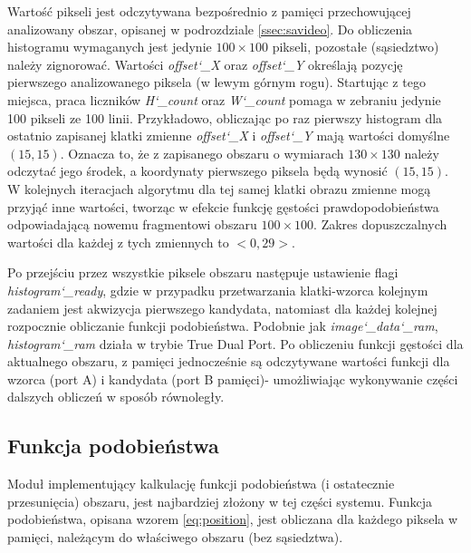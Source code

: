Wartość pikseli jest odczytywana bezpośrednio z pamięci przechowującej analizowany obszar, opisanej w podrozdziale \ref{ssec:savideo}. 
Do obliczenia histogramu wymaganych jest jedynie $100\times 100$ pikseli, pozostałe (sąsiedztwo) należy zignorować. %
Wartości \textit{offset\char`_X} oraz \textit{offset\char`_Y} określają pozycję pierwszego analizowanego piksela (w lewym górnym rogu). Startując z tego miejsca, praca liczników \textit{H\char`_count} oraz \textit{W\char`_count} pomaga w zebraniu jedynie 100 pikseli ze 100 linii. %
Przykładowo, obliczając po raz pierwszy histogram dla ostatnio zapisanej klatki zmienne \textit{offset\char`_X} i \textit{offset\char`_Y} mają wartości domyślne $(15,15)$. 
Oznacza to, że z zapisanego obszaru o wymiarach $130\times 130$ należy odczytać jego środek, a koordynaty pierwszego piksela będą wynosić $(15,15)$. W kolejnych iteracjach algorytmu dla tej samej klatki obrazu zmienne mogą przyjąć inne wartości, tworząc w efekcie funkcję gęstości prawdopodobieństwa odpowiadającą nowemu fragmentowi obszaru $100\times 100$. %
Zakres dopuszczalnych wartości dla każdej z tych zmiennych to $<0,29>$. 

Po przejściu przez wszystkie piksele obszaru następuje ustawienie flagi \textit{histogram\char`_ready}, gdzie w przypadku przetwarzania klatki-wzorca kolejnym zadaniem jest akwizycja pierwszego kandydata, natomiast dla każdej kolejnej rozpocznie obliczanie funkcji podobieństwa.
Podobnie jak \textit{image\char`_data\char`_ram}, \textit{histogram\char`_ram} działa w trybie True Dual Port. %
Po obliczeniu funkcji gęstości dla aktualnego obszaru, z pamięci jednocześnie są odczytywane wartości funkcji dla wzorca (port A) i kandydata (port B pamięci)- umożliwiając wykonywanie części dalszych obliczeń w sposób równoległy. %


\subsection{Funkcja podobieństwa}

Moduł implementujący kalkulację funkcji podobieństwa (i ostatecznie przesunięcia) obszaru, jest najbardziej złożony w tej części systemu. 
Funkcja podobieństwa, opisana wzorem \eqref{eq:position}, jest obliczana dla każdego piksela w pamięci, należącym do właściwego obszaru (bez sąsiedztwa). %

